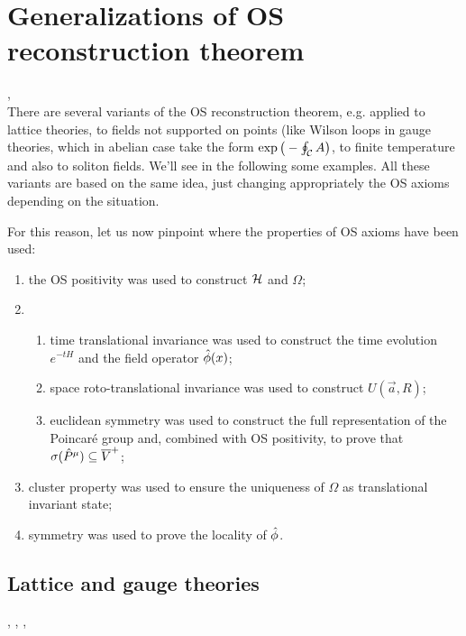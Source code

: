 \documentclass[../main/main.tex]{subfiles}
\begin{document}
\section{Generalizations of OS reconstruction theorem}

\cite{Summers:2016}, \cite[Section 6.1]{Glimm:1987}\\

There are several variants of the OS reconstruction theorem, e.g. applied to lattice theories, to fields not supported on points (like Wilson loops in gauge theories, which in abelian case take the form $\exp\big(-\oint_\mathcal C A\big)$, to finite temperature and also to soliton fields. We'll see in the following some examples. 
All these variants are based on the same idea, just changing appropriately the OS axioms depending on the situation. 

For this reason, let us now pinpoint where the properties of OS axioms have been used:
\begin{enumerate}[label=(\arabic*)]
	\item the OS positivity was used to construct $\mathcal H$ and $\Omega$;
	\item \begin{enumerate}[label=(\roman*)]
			\item time translational invariance was used to construct the time evolution $e^{-tH}$ and the field operator $\hat{\phi}(x)$;
			\item space roto-translational invariance was used to construct $U(\vec a,R)$;
			\item euclidean symmetry was used to construct the full representation of the Poincaré group and, combined with OS positivity, to prove that $\sigma(\hat{P}^\mu)\subseteq \overline V^+$;
		\end{enumerate}
	\item cluster property was used to ensure the uniqueness of $\Omega$ as translational invariant state;
	\item symmetry was used to prove the locality of $\hat{\phi}$.
\end{enumerate}

\subsection{Lattice and gauge theories}

\cite[Section 4]{Frohlich:1980aa}, \cite{Osterwalder:1977pc}, \cite{Seiler:1982}, \cite[Section 6.4]{Strocchi:1993}\\
\end{document}
